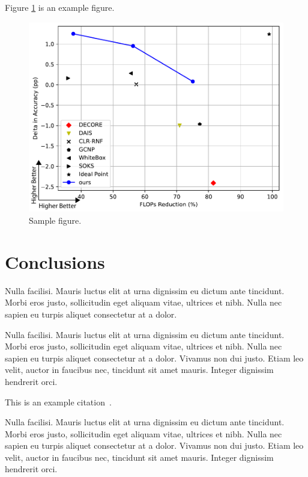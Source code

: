 \documentclass[a4paper,10pt,twocolumn]{article}
\begin{document}
Figure \ref*{fig:sample_figure} is an example figure.

\begin{figure}[htbp]
    \centering
    \includegraphics[width=\linewidth]{Figures/sample_figure.pdf}
    \caption{Sample figure.}
    \label{fig:sample_figure}
\end{figure}

\section*{Conclusions}

Nulla facilisi. Mauris luctus elit at urna dignissim eu dictum ante tincidunt. Morbi eros justo, sollicitudin eget aliquam vitae, ultrices et nibh. Nulla nec sapien eu turpis aliquet consectetur at a dolor.

Nulla facilisi. Mauris luctus elit at urna dignissim eu dictum ante tincidunt. Morbi eros justo, sollicitudin eget aliquam vitae, ultrices et nibh. Nulla nec sapien eu turpis aliquet consectetur at a dolor. Vivamus non dui justo. Etiam leo velit, auctor in faucibus nec, tincidunt sit amet mauris. Integer dignissim hendrerit orci.

This is an example citation~\cite{example1, example2}.

Nulla facilisi. Mauris luctus elit at urna dignissim eu dictum ante tincidunt. Morbi eros justo, sollicitudin eget aliquam vitae, ultrices et nibh. Nulla nec sapien eu turpis aliquet consectetur at a dolor. Vivamus non dui justo. Etiam leo velit, auctor in faucibus nec, tincidunt sit amet mauris. Integer dignissim hendrerit orci.
\end{document}
